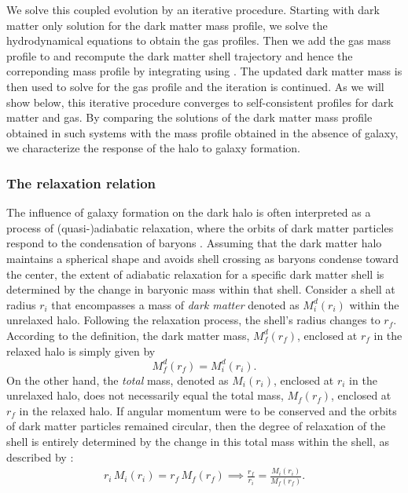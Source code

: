 We solve this coupled evolution by an iterative procedure. Starting with dark matter only solution for the dark matter mass profile, we solve the hydrodynamical equations to obtain the gas profiles. Then we add the gas mass profile to  and recompute the dark matter shell trajectory and hence the correponding mass profile by integrating using . The updated dark matter mass is then used to solve for the gas profile and the iteration is continued. As we will show below, this iterative procedure converges to self-consistent profiles for dark matter and gas. By comparing the solutions of the dark matter mass profile obtained in such systems with the mass profile obtained in the absence of galaxy, we characterize the response of the halo to galaxy formation.

\subsubsection{The relaxation relation}
\label{sec:methods-relx-reln}
The influence of galaxy formation on the dark halo is often interpreted as a process of (quasi-)adiabatic relaxation, where the orbits of dark matter particles respond to the condensation of baryons \citep[][]{1986Blumenthal,2010Abadi_NFBS,2011TeyssierMMDM,2023Velmani&Paranjape}. Assuming that the dark matter halo maintains a spherical shape and avoids shell crossing as baryons condense toward the center, the extent of adiabatic relaxation for a specific dark matter shell is determined by the change in baryonic mass within that shell. Consider a shell at radius $r_i$ that encompasses a mass of \emph{dark matter} denoted as $M_i^d(r_i)$ within the unrelaxed halo. Following the relaxation process, the shell's radius changes to $r_f$. According to the definition, the dark matter mass, $M_f^d(r_f)$, enclosed at $r_f$ in the relaxed halo is simply given by
\begin{equation}
M_f^d(r_f) = M_i^d(r_i).
\label{eq:DMmass}
\end{equation}
On the other hand, the \emph{total} mass, denoted as $M_i(r_i)$, enclosed at $r_i$ in the unrelaxed halo, does not necessarily equal the total mass, $M_f(r_f)$, enclosed at $r_f$ in the relaxed halo. If angular momentum were to be conserved and the orbits of dark matter particles remained circular, then the degree of relaxation of the shell is entirely determined by the change in this total mass within the shell, as described by \citep[][]{1986Blumenthal}:
\begin{align}
r_i \,M_i(r_i) = r_f \,M_f(r_f) %
\implies 
\frac{r_f}{r_i} = \frac{M_i(r_i)}{M_f(r_f)}.
\label{eq:AR}
\end{align}

